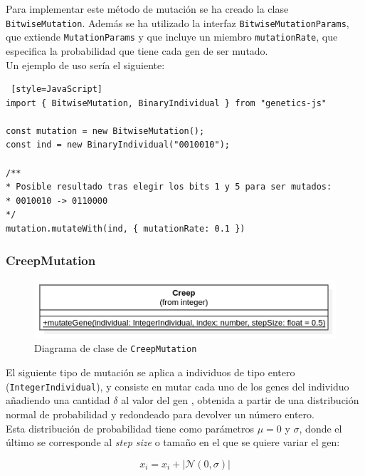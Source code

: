 Para implementar este método de mutación se ha creado la clase \texttt{BitwiseMutation}. Además se ha utilizado la interfaz \texttt{BitwiseMutationParams}, que extiende \texttt{MutationParams} y que incluye un miembro \texttt{mutationRate}, que especifica la probabilidad que tiene cada gen de ser mutado. \\

Un ejemplo de uso sería el siguiente: \\

\begin{lstlisting} [style=JavaScript]
import { BitwiseMutation, BinaryIndividual } from "genetics-js"

const mutation = new BitwiseMutation();
const ind = new BinaryIndividual("0010010");

/**
* Posible resultado tras elegir los bits 1 y 5 para ser mutados:
* 0010010 -> 0110000
*/
mutation.mutateWith(ind, { mutationRate: 0.1 })
\end{lstlisting}

\subsubsection{CreepMutation}

\begin{figure}[ht]
    \centering
    \includegraphics[scale=0.5]{mem/images/cap-4/4.2.7(Mutation)/CreepMutatioon.png}
    \caption{Diagrama de clase de \texttt{CreepMutation}}
    \label{fig:my_label}
\end{figure}

El siguiente tipo de mutación se aplica a individuos de tipo entero (\texttt{IntegerIndividual}), y consiste en mutar cada uno de los genes del individuo añadiendo una cantidad $\delta$ al valor del gen \cite{davis1991handbook}, obtenida a partir de una distribución normal de probabilidad y redondeado para devolver un número entero. \\

Esta distribución de probabilidad tiene como parámetros $\mu = 0$ y $\sigma$, donde el último se corresponde al \textit{step size} o tamaño en el que se quiere variar el gen:

\begin{equation}
    x_i = x_i + |\mathcal{N}(0, \sigma)|
\end{equation}

